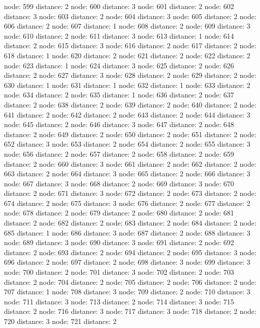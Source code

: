 \documentclass{article}
\begin{document}
node: 599 distance: 2
node: 600 distance: 3
node: 601 distance: 2
node: 602 distance: 3
node: 603 distance: 2
node: 604 distance: 3
node: 605 distance: 2
node: 606 distance: 2
node: 607 distance: 1
node: 608 distance: 2
node: 609 distance: 3
node: 610 distance: 2
node: 611 distance: 3
node: 613 distance: 1
node: 614 distance: 2
node: 615 distance: 3
node: 616 distance: 2
node: 617 distance: 2
node: 618 distance: 1
node: 620 distance: 2
node: 621 distance: 2
node: 622 distance: 2
node: 623 distance: 1
node: 624 distance: 3
node: 625 distance: 2
node: 626 distance: 2
node: 627 distance: 3
node: 628 distance: 2
node: 629 distance: 2
node: 630 distance: 1
node: 631 distance: 1
node: 632 distance: 1
node: 633 distance: 2
node: 634 distance: 2
node: 635 distance: 1
node: 636 distance: 2
node: 637 distance: 2
node: 638 distance: 2
node: 639 distance: 2
node: 640 distance: 2
node: 641 distance: 2
node: 642 distance: 2
node: 643 distance: 2
node: 644 distance: 3
node: 645 distance: 2
node: 646 distance: 3
node: 647 distance: 2
node: 648 distance: 2
node: 649 distance: 2
node: 650 distance: 2
node: 651 distance: 2
node: 652 distance: 3
node: 653 distance: 2
node: 654 distance: 2
node: 655 distance: 3
node: 656 distance: 2
node: 657 distance: 2
node: 658 distance: 2
node: 659 distance: 2
node: 660 distance: 3
node: 661 distance: 2
node: 662 distance: 2
node: 663 distance: 2
node: 664 distance: 3
node: 665 distance: 2
node: 666 distance: 3
node: 667 distance: 3
node: 668 distance: 2
node: 669 distance: 3
node: 670 distance: 2
node: 671 distance: 3
node: 672 distance: 2
node: 673 distance: 2
node: 674 distance: 2
node: 675 distance: 3
node: 676 distance: 2
node: 677 distance: 2
node: 678 distance: 2
node: 679 distance: 2
node: 680 distance: 2
node: 681 distance: 2
node: 682 distance: 2
node: 683 distance: 2
node: 684 distance: 2
node: 685 distance: 1
node: 686 distance: 3
node: 687 distance: 2
node: 688 distance: 3
node: 689 distance: 3
node: 690 distance: 3
node: 691 distance: 2
node: 692 distance: 2
node: 693 distance: 2
node: 694 distance: 2
node: 695 distance: 3
node: 696 distance: 2
node: 697 distance: 2
node: 698 distance: 3
node: 699 distance: 3
node: 700 distance: 2
node: 701 distance: 3
node: 702 distance: 2
node: 703 distance: 2
node: 704 distance: 2
node: 705 distance: 2
node: 706 distance: 2
node: 707 distance: 1
node: 708 distance: 3
node: 709 distance: 2
node: 710 distance: 3
node: 711 distance: 3
node: 713 distance: 2
node: 714 distance: 3
node: 715 distance: 2
node: 716 distance: 3
node: 717 distance: 3
node: 718 distance: 2
node: 720 distance: 3
node: 721 distance: 2
\end{document}
